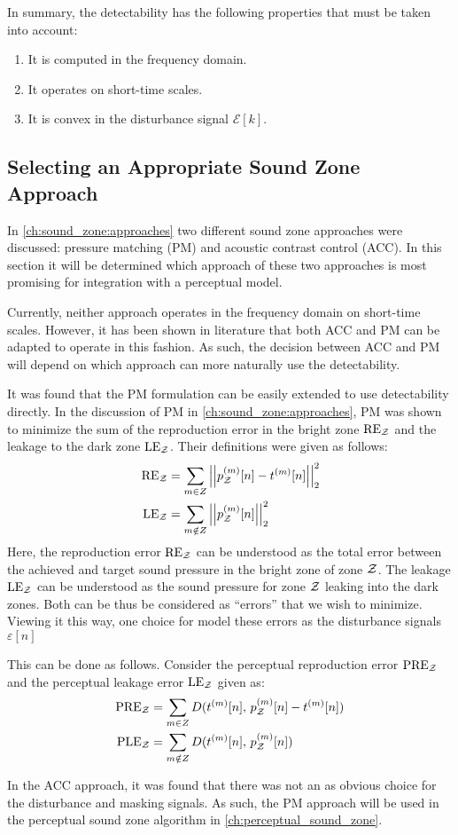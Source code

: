 In summary, the detectability has the following properties that must be taken into account:
\begin{enumerate}
    \item It is computed in the frequency domain.
    \item It operates on short-time scales.
    \item It is convex in the disturbance signal $\mathcal{E}[k]$.
\end{enumerate}

\subsection{Selecting an Appropriate Sound Zone Approach}
\label{ch:sound_zones:approach_selection:selection}
In \autoref{ch:sound_zone:approaches} two different sound zone approaches were discussed: pressure matching (PM)
and acoustic contrast control (ACC).
In this section it will be determined which approach of these two approaches is most promising for integration with a perceptual model.

Currently, neither approach operates in the frequency domain on short-time scales. 
However, it has been shown in literature that both ACC and PM can be adapted to operate in this fashion.
As such, the decision between ACC and PM will depend on which approach can more naturally use the detectability.

It was found that the PM formulation can be easily extended to use detectability directly.
In the discussion of PM in \autoref{ch:sound_zone:approaches}, PM was shown to minimize the sum of the reproduction error in the bright zone $\text{RE}_{\mathcal{Z}}$ 
and the leakage to the dark zone $\text{LE}_{\mathcal{Z}}$. 
Their definitions were given as follows:
\begin{align}
    \text{RE}_\zz &= \sum_{m\in Z} \norm[2][2]{p_\zz^{(m)}[n] - t^{(m)}[n]} \\
    \text{LE}_\zz &= \sum_{m\notin Z} \norm[2][2]{p_\zz^{(m)}[n]} 
\end{align}
Here, the reproduction error $\text{RE}_{\mathcal{Z}}$ can be understood as the total error between the achieved and target sound pressure in the bright zone of zone $\mathcal{Z}$. 
The leakage $\text{LE}_{\mathcal{Z}}$ can be understood as the sound pressure for zone $\mathcal{Z}$ leaking into the dark zones.
Both can be thus be considered as ``errors'' that we wish to minimize.
Viewing it this way, one choice for model these errors as the disturbance signals $\varepsilon[n]$ 

This can be done as follows.
Consider the perceptual reproduction error $\text{PRE}_{\mathcal{Z}}$ and the perceptual leakage error $\text{LE}_{\mathcal{Z}}$ given as:
\begin{align}
    \text{PRE}_{\mathcal{Z}} &= \sum_{m\in Z} D(t^{(m)}[n],\,p_{\mathcal{Z}}^{(m)}[n] - t^{(m)}[n]) \\
    \text{PLE}_{\mathcal{Z}} &= \sum_{m\notin Z} D(t^{(m)}[n],\,p_{\mathcal{Z}}^{(m)}[n])  
\end{align}

In the ACC approach, it was found that there was not an as obvious choice for the disturbance and masking signals.
As such, the PM approach will be used in the perceptual sound zone algorithm in \autoref{ch:perceptual_sound_zone}.
